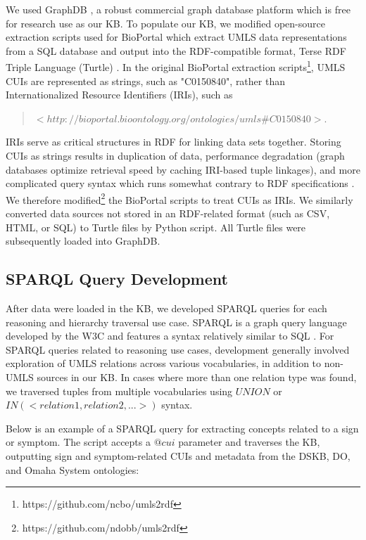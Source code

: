 \documentclass[../main.tex]{subfiles}
\begin{document}
We used GraphDB \cite{graphdb}, a robust commercial graph database platform which is free for research use as our KB. To populate our KB, we modified open-source extraction scripts used for BioPortal \cite{noy2009bioportal} which extract UMLS data representations from a SQL database and output into the RDF-compatible format, Terse RDF Triple Language (Turtle) \cite{ttl}. In the original BioPortal extraction scripts\footnote{https://github.com/ncbo/umls2rdf}, UMLS CUIs are represented as strings, such as "C0150840", rather than Internationalized Resource Identifiers (IRIs), such as

\begin{quote}
\centering
$<http://bioportal.bioontology.org/ontologies/ umls\#C0150840>$.
\end{quote}

\noindent IRIs serve as critical structures in RDF for linking data sets together. Storing CUIs as strings results in duplication of data, performance degradation (graph databases optimize retrieval speed by caching IRI-based tuple linkages), and more complicated query syntax which runs somewhat contrary to RDF specifications \cite{manola2004rdf}. We therefore modified\footnote{https://github.com/ndobb/umls2rdf} the BioPortal scripts to treat CUIs as IRIs. We similarly converted data sources not stored in an RDF-related format (such as CSV, HTML, or SQL) to Turtle files by Python script. All Turtle files were subsequently loaded into GraphDB. \\

\subsection{SPARQL Query Development}

After data were loaded in the KB, we developed SPARQL queries for each reasoning and hierarchy traversal use case. SPARQL is a graph query language developed by the W3C and features a syntax relatively similar to SQL \cite{sparql}. For SPARQL queries related to reasoning use cases, development generally involved exploration of UMLS relations across various vocabularies, in addition to non-UMLS sources in our KB. In cases where more than one relation type was found, we traversed tuples from multiple vocabularies using $UNION$ or $IN (<relation1, relation2, ...>)$ syntax.

Below is an example of a SPARQL query for extracting concepts related to a sign or symptom. The script accepts a $@cui$ parameter and traverses the KB, outputting sign and symptom-related CUIs and metadata from the DSKB, DO, and Omaha System ontologies:  \\
\end{document}
